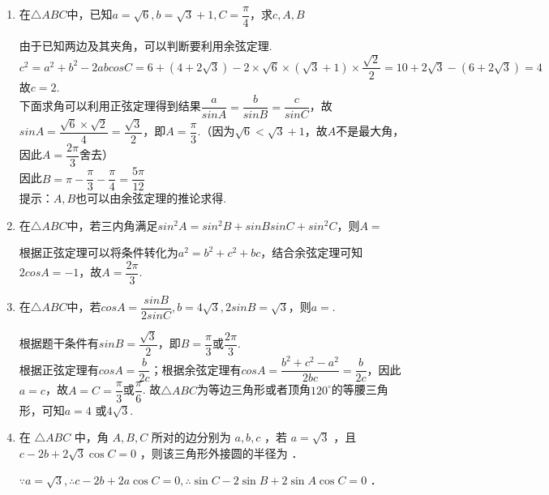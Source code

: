 \begin{enumerate}
    \item 在$\triangle ABC$中，已知$a = \sqrt{6}, b = \sqrt{3}+1, C = \dfrac{\pi}{4}$，求$c, A, B$
    \begin{jieda}
        由于已知两边及其夹角，可以判断要利用余弦定理.\\
        $c^2 = a^2+b^2 - 2abcosC = 6 + (4 + 2\sqrt{3}) - 2 \times \sqrt{6} \times (\sqrt{3}+1) \times \dfrac{\sqrt{2}}{2} = 10 + 2\sqrt{3} - (6 + 2\sqrt{3}) = 4$ \\
        故$c = 2$.\\
        下面求角可以利用正弦定理得到结果$\dfrac{a}{sinA} = \dfrac{b}{sinB} = \dfrac{c}{sinC}$，故$sinA = \dfrac{\sqrt{6} \times \sqrt{2}}{4} = \dfrac{\sqrt{3}}{2}$，即$A = \dfrac{\pi}{3}$.（因为$\sqrt{6} < \sqrt{3}+1$，故$A$不是最大角，因此$A = \dfrac{2\pi}{3}$舍去）\\
        因此$B = \pi - \dfrac{\pi}{3} - \dfrac{\pi}{4} = \dfrac{5\pi}{12}$ \\
        提示：$A, B$也可以由余弦定理的推论求得.
    \end{jieda}
    \item 在$\triangle ABC$中，若三内角满足$sin^2A = sin^2B + sinBsinC+sin^2C$，则$A = $
    \begin{jieda}
        根据正弦定理可以将条件转化为$a^2 = b^2 + c^2 + bc$，结合余弦定理可知$2cosA = -1$，故$A = \dfrac{2\pi}{3}$.
    \end{jieda}
    
    \item 在$\triangle ABC$中，若$cosA = \dfrac{sinB}{2sinC}, b = 4\sqrt{3}, 2sinB = \sqrt{3}$，则$a = $.
    \begin{jieda}
        根据题干条件有$sinB = \dfrac{\sqrt{3}}{2}$，即$B = \dfrac{\pi}{3}$或$\dfrac{2\pi}{3}$. \\
        根据正弦定理有$cosA = \dfrac{b}{2c}$；根据余弦定理有$cosA = \dfrac{b^2+c^2-a^2}{2bc} = \dfrac{b}{2c}$，因此$a = c$，故$A = C = \dfrac{\pi}{3}$或$\dfrac{\pi}{6}$. 故$\triangle ABC$为等边三角形或者顶角$120^{\circ}$的等腰三角形，可知$a = 4$ 或$4\sqrt{3}$.
    \end{jieda}
    \item 在 $\triangle A B C$ 中，角 $A, B, C$ 所对的边分别为 $a, b, c$ ，若 $a=\sqrt{3}$ ，且 $c-2 b+2 \sqrt{3} \cos C=0$ ，则该三角形外接圆的半径为 ．

    \begin{jieda}
    $\because a=\sqrt{3}, \therefore c-2 b+2 a \cos C=0, \therefore \sin C-2 \sin B+2 \sin A \cos C=0$ ．
    

\end{jieda}
\end{enumerate}

